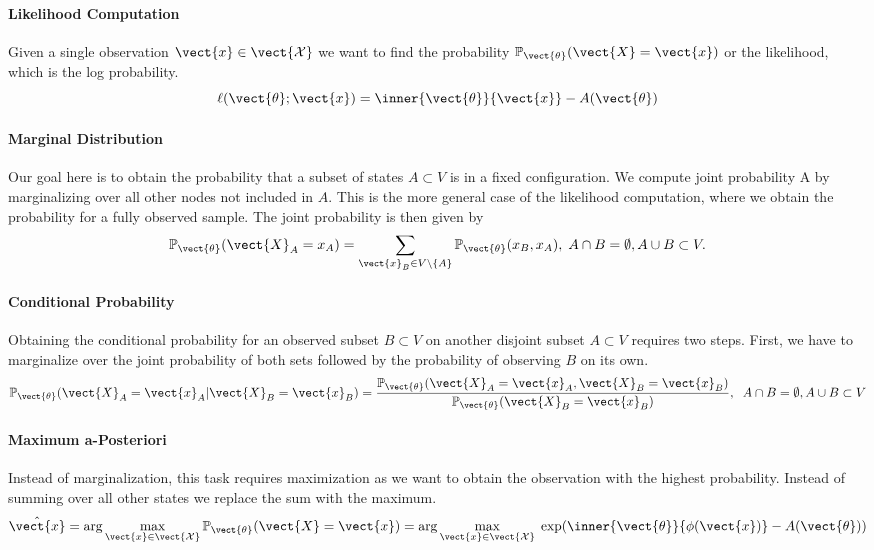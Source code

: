 \paragraph*{Likelihood Computation}
Given a single observation $\vect{x} \in \vect{\mathcal{X}}$ we want to find the probability  $\mathbb{P}_{\vect{\theta}}(\vect{X} = \vect{x})$ or the likelihood, which is the log probability.
\begin{equation}
    \ell(\vect{\theta}; \vect{x}) = \inner{\vect{\theta}}{\vect{x}} - A(\vect{\theta})
\end{equation}

\paragraph*{Marginal Distribution}
Our goal here is to obtain the probability that a subset of states $A \subset V$ is in a fixed configuration.
We compute joint probability \wrt A by marginalizing over all other nodes not included in $A$. 
This is the more general case of the likelihood computation, where we obtain the probability for a fully observed sample.
The joint probability is then given by
    \begin{equation}
        \mathbb{P}_{\vect{\theta}}(\vect{X}_A = x_A) = \sum_{\vect{x}_B \in V \setminus\{A\}} \mathbb{P}_{\vect{\theta}}(x_B , x_A), \; A \cap B = \emptyset, A \cup B \subset V.
    \end{equation}

\paragraph*{Conditional Probability}
Obtaining the conditional probability for an observed subset $B \subset V$ on another disjoint subset $A \subset V$ requires two steps. First, we have to marginalize over the joint probability of both sets followed by the probability of observing $B$ on its own.
    \begin{equation}
        \mathbb{P}_{\vect{\theta}}(\vect{X}_A = \vect{x}_A \lvert \vect{X}_B = \vect{x}_B) = \frac{\mathbb{P}_{\vect{\theta}}(\vect{X}_A = \vect{x}_A , \vect{X}_B = \vect{x}_B)}{\mathbb{P}_{\vect{\theta}}(\vect{X}_B = \vect{x}_B)}, \;\; A \cap B = \emptyset, A \cup B \subset V
    \end{equation}

\paragraph*{Maximum a-Posteriori}
Instead of marginalization, this task requires maximization as we want to obtain the observation with the highest probability. 
Instead of summing over all other states we replace the sum with the maximum.
\begin{equation}
    \label{eq:map}
    \hat{\vect{x}} = \arg\max_{\vect{x} \in \vect{\mathcal{X}}} \mathbb{P}_{\vect{\theta}}(\vect{X} = \vect{x}) = \arg\max_{\vect{x} \in \vect{\mathcal{X}}} \; \exp(\inner{\vect{\theta}}{\phi(\vect{x})} - A(\vect{\theta}))
\end{equation}

